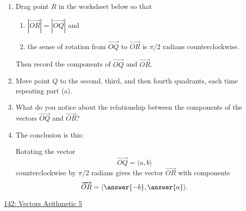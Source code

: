 \documentclass{ximera}
\begin{document}
\begin{question} \label{Q77ee333}


\begin{enumerate}
\item Drag point $R$ in the worksheet below so that
\begin{enumerate}
\item $\left|\overrightarrow{OR}\right| = \left|\overrightarrow{OQ}\right|$ and
\item the sense of rotation from $\overrightarrow{OQ}$ to $\overrightarrow{OR}$ is $\pi/2$ radians counterclockwise.
\end{enumerate}
Then record the components of $\overrightarrow{OQ}$ and $\overrightarrow{OR}$.

\item Move point $Q$ to the second, third, and then fourth quadrants, each time repeating part (a).

\item What do you notice about the relationship between the components of the vectors $\overrightarrow{OQ}$ and $\overrightarrow{OR}$?

\item The conclusion is this:

Rotating the vector 
\[
  \overrightarrow{OQ} = \langle a, b\rangle
\]
counterclockwise by $\pi/2$ radians gives the vector $\overrightarrow{OR}$ with components
\[
  \overrightarrow{OR} = \langle \answer{-b}, \answer{a}\rangle .
\] 

\end{enumerate}

\begin{onlineOnly}
    \begin{center}
\end{center}
\end{onlineOnly}

\href{https://www.desmos.com/calculator/in7whvqoay}{142: Vectors Arithmetic 5}


\end{question}
\end{document}
